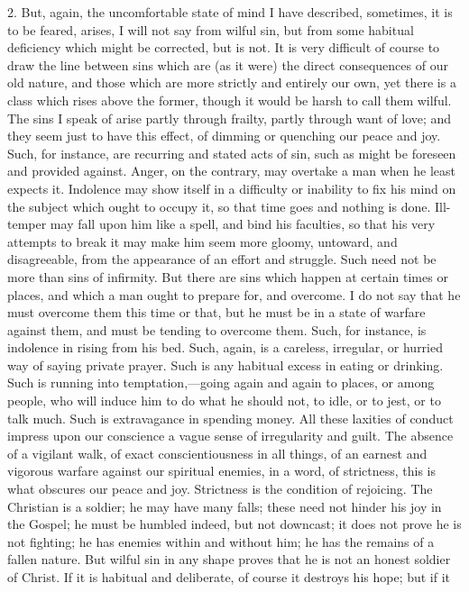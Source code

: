 2. But, again, the uncomfortable state of mind I have described,
sometimes, it is to be feared, arises, I will not say from wilful sin,
but from some habitual deficiency which might be corrected, but is
not. It is very difficult of course to draw the line between sins
which are (as it were) the direct consequences of our old nature, and
those which are more strictly and entirely our own, yet there is a
class which rises above the former, though it would be harsh to call
them wilful. The sins I speak of arise partly through frailty, partly
through want of love; and they seem just to have this effect, of
dimming or quenching our peace and joy. Such, for instance, are
recurring and stated acts of sin, such as might be foreseen and
provided against. Anger, on the contrary, may overtake a man when he
least expects it. Indolence may show itself in a difficulty or
inability to fix his mind on the subject which ought to occupy it, so
that time goes and nothing is done. Ill-temper may fall upon him like
a spell, and bind his faculties, so that his very attempts to break it
may make him seem more gloomy, untoward, and disagreeable, from the
appearance of an effort and struggle. Such need not be more than sins
of infirmity. But there are sins which happen at certain times or
places, and which a man ought to prepare for, and overcome. I do not
say that he must overcome them this time or that, but he must be in a
state of warfare against them, and must be tending to overcome them.
Such, for instance, is indolence in rising from his bed. Such, again,
is a careless, irregular, or hurried way of saying private prayer.
Such is any habitual excess in eating or drinking. Such is running
into temptation,—going again and again to places, or among people,
who will induce him to do what he should not, to idle, or to jest, or
to talk much. Such is extravagance in spending money. All these
laxities of conduct impress upon our conscience a vague sense of
irregularity and guilt. The absence of a vigilant walk, of exact
conscientiousness in all things, of an earnest and vigorous warfare
against our spiritual enemies, in a word, of strictness, this is what
obscures our peace and joy. Strictness is the condition of rejoicing.
The Christian is a soldier; he may have many falls; these need not
hinder his joy in the Gospel; he must be humbled indeed, but not
downcast; it does not prove he is not fighting; he has enemies within
and without him; he has the remains of a fallen nature. But wilful sin
in any shape proves that he is not an honest soldier of Christ. If it
is habitual and deliberate, of course it destroys his hope; but if it
